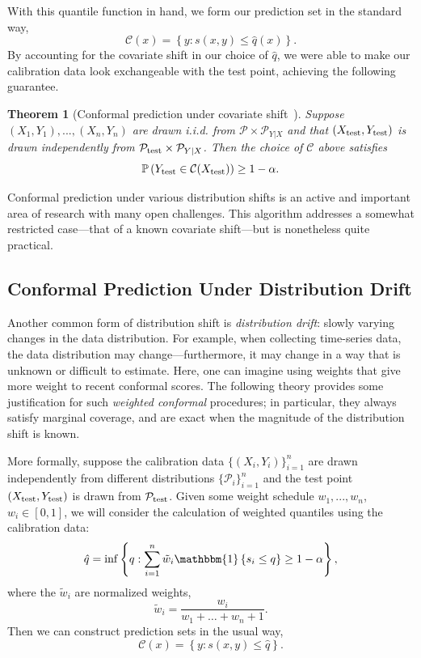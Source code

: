 \documentclass[10pt]{article}
\newtheorem{theorem}{Theorem}
\newcommand{\C}{\mathcal{C}}
\newcommand{\ind}[1]{\mathbbm{1}\left\{#1\right\}}
\renewcommand{\P}{\mathbb{P}}
\begin{document}
With this quantile function in hand, we form our prediction set in the standard way,
\begin{equation}
    \C(x) = \left\{ y : s(x,y) \leq \hat{q}(x)\right\}.
\end{equation}
By accounting for the covariate shift in our choice of $\hat{q}$, we were able to make our calibration data look exchangeable with the test point, achieving the following guarantee.
\begin{theorem}[Conformal prediction under covariate shift~\cite{tibshirani2019conformal}]
    Suppose $(X_1,Y_1),...,(X_n,Y_n)$ are drawn i.i.d. from $\mathcal{P} \times \mathcal{P}_{Y|X}$ and that $(X_{\rm test}, Y_{\rm test})$ is drawn independently from $\mathcal{P}_{\rm test} \times \mathcal{P}_{Y|X}$.
    Then the choice of $\C$ above satisfies
    \begin{equation}
        \P\left( Y_{\rm test} \in \C(X_{\rm test}) \right) \geq 1-\alpha.
    \end{equation}
\end{theorem}

Conformal prediction under various distribution shifts is an active and important area of research with many open challenges.
This algorithm addresses a somewhat restricted case---that of a known covariate shift---but is nonetheless quite practical.

\subsection{Conformal Prediction Under Distribution Drift}
\label{subsec:drift}
Another common form of distribution shift is \emph{distribution drift}: slowly varying changes in the data distribution.
For example, when collecting time-series data, the data distribution may change---furthermore, it may change in a way that is unknown or difficult to estimate.
Here, one can imagine using weights that give more weight to recent conformal scores.
The following theory provides some justification for such \emph{weighted conformal} procedures; in particular, they always satisfy marginal coverage, and are exact when the magnitude of the distribution shift is known. 

More formally, suppose the calibration data $\{(X_i,Y_i)\}_{i=1}^n$ are drawn independently from different distributions $\{\mathcal{P}_i\}_{i=1}^n$ and the test point $(X_{\rm test}, Y_{\rm test})$ is drawn from $\mathcal{P}_{\rm test}$.
Given some weight schedule $w_1,...,w_n$, $w_i \in [0, 1]$, we will consider the calculation of weighted quantiles using the calibration data:
\begin{equation}
  \hat{q} = \inf\left\{ q :  \sum\limits_{i=1}^n \tilde{w}_i \ind{s_i \leq q} \geq 1-\alpha\right\},
\end{equation}
where the $\tilde{w}_i$ are normalized weights,
\begin{equation}
  \tilde{w}_i = \frac{w_i}{w_1 + \ldots + w_n + 1}.
\end{equation}
Then we can construct prediction sets in the usual way,
\begin{equation}
    \C(x) = \left\{ y : s(x,y) \leq \hat{q}\right\}.
\end{equation}
\end{document}
